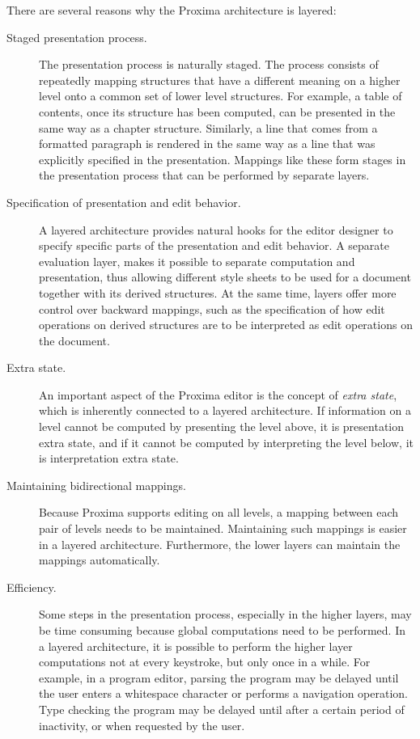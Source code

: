 \documentclass{speauth}
\begin{document}


There are several reasons why the Proxima architecture is layered: 

\begin{description}

\item[Staged presentation process.]
The presentation process is naturally staged. The process consists of repeatedly mapping  structures that have a different meaning on a higher level onto a common set of lower level structures. For example, a table of contents, once its structure has been computed, can be presented in the same way as a chapter structure. Similarly, a line that comes from a formatted paragraph is rendered in the same way as a line that was explicitly specified in the presentation. Mappings like these form stages in the presentation process that can be performed by separate layers.

\item[Specification of presentation and edit behavior.]
A layered architecture provides natural hooks for the editor designer to specify specific parts of the presentation and edit behavior. A separate evaluation layer, makes it possible to separate computation and presentation, thus allowing different style sheets to be used for a document together with its derived structures. At the same time, layers offer more control over backward mappings, such as the specification of how edit operations on derived structures are to be interpreted as edit operations on the document.

\item[Extra state.]
An important aspect of the Proxima editor is the concept of {\em extra state}, which is inherently connected to a layered architecture. If information on a level cannot be computed by presenting the level above, it is presentation extra state, and if it cannot be computed by interpreting the level below, it is interpretation extra state.

\item[Maintaining bidirectional mappings.]
Because Proxima supports editing on all levels, a mapping between each pair of levels needs to be maintained. Maintaining such mappings is easier in a layered architecture. Furthermore, the lower layers can maintain the mappings automatically.

\item[Efficiency.]
Some steps in the presentation process, especially in the higher layers, may be time consuming because global computations need to be performed. In a layered architecture, it is possible to perform the higher layer computations not at every keystroke, but only once in a while. For example, in a program editor, parsing the program may be delayed until the user enters a whitespace character or performs a navigation operation. Type checking the program may be delayed until after a certain period of inactivity, or when requested by the user.
\end{description}
\end{document}
